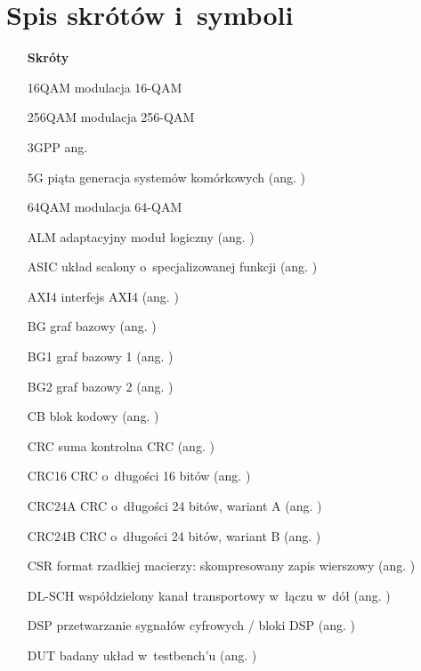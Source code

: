 \chapter{Spis skrótów i~symboli}

\begin{itemize}

\item[] \textbf{Skróty}

\item[16QAM] modulacja 16-QAM
\item[256QAM] modulacja 256-QAM
\item[3GPP] ang. 
\item[5G] piąta generacja systemów komórkowych (ang. )
\item[64QAM] modulacja 64-QAM
\item[ALM] adaptacyjny moduł logiczny (ang. )
\item[ASIC] układ scalony o~specjalizowanej funkcji (ang. )
\item[AXI4] interfejs AXI4 (ang. )

\item[BG] graf bazowy (ang. )
\item[BG1] graf bazowy 1 (ang. )
\item[BG2] graf bazowy 2 (ang. )

\item[CB] blok kodowy (ang. )
\item[CRC] suma kontrolna CRC (ang. )
\item[CRC16] CRC o~długości 16 bitów (ang. )
\item[CRC24A] CRC o~długości 24 bitów, wariant A (ang. )
\item[CRC24B] CRC o~długości 24 bitów, wariant B (ang. )
\item[CSR] format rzadkiej macierzy: skompresowany zapis wierszowy (ang. )

\item[DL-SCH] współdzielony kanał transportowy w~łączu w~dół (ang. )
\item[DSP] przetwarzanie sygnałów cyfrowych / bloki DSP (ang. )
\item[DUT] badany układ w~{testbench'u} (ang. )


\end{itemize}
